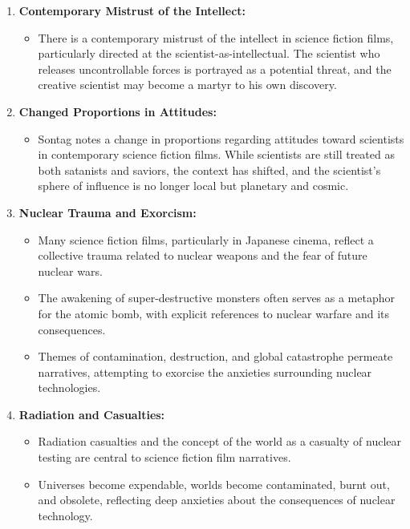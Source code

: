 \documentclass[11pt,fleqn]{book}
\begin{document}
\begin{enumerate}[label=\arabic*.]
    \item \textbf{Contemporary Mistrust of the Intellect:}
    \begin{itemize}
        \item There is a contemporary mistrust of the intellect in science fiction films, particularly directed at the scientist-as-intellectual. The scientist who releases uncontrollable forces is portrayed as a potential threat, and the creative scientist may become a martyr to his own discovery.
    \end{itemize}

    \item \textbf{Changed Proportions in Attitudes:}
    \begin{itemize}
        \item Sontag notes a change in proportions regarding attitudes toward scientists in contemporary science fiction films. While scientists are still treated as both satanists and saviors, the context has shifted, and the scientist's sphere of influence is no longer local but planetary and cosmic.
    \end{itemize}
    
    \item \textbf{Nuclear Trauma and Exorcism:}
    \begin{itemize}
    \item Many science fiction films, particularly in Japanese cinema, reflect a collective trauma related to nuclear weapons and the fear of future nuclear wars.
    \item The awakening of super-destructive monsters often serves as a metaphor for the atomic bomb, with explicit references to nuclear warfare and its consequences.
    \item Themes of contamination, destruction, and global catastrophe permeate narratives, attempting to exorcise the anxieties surrounding nuclear technologies.
    \end{itemize}
\item \textbf{Radiation and Casualties:}
\begin{itemize}
    \item Radiation casualties and the concept of the world as a casualty of nuclear testing are central to science fiction film narratives.
    \item Universes become expendable, worlds become contaminated, burnt out, and obsolete, reflecting deep anxieties about the consequences of nuclear technology.
\end{itemize}


\end{enumerate}
\end{document}
